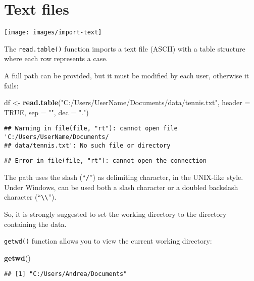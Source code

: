 \documentclass[]{book}
\newenvironment{Shaded}{\begin{snugshade}}{\end{snugshade}}
\newcommand{\KeywordTok}[1]{\textcolor[rgb]{0.13,0.29,0.53}{\textbf{{#1}}}}
\newcommand{\DataTypeTok}[1]{\textcolor[rgb]{0.13,0.29,0.53}{{#1}}}
\newcommand{\StringTok}[1]{\textcolor[rgb]{0.31,0.60,0.02}{{#1}}}
\newcommand{\OtherTok}[1]{\textcolor[rgb]{0.56,0.35,0.01}{{#1}}}
\newcommand{\NormalTok}[1]{{#1}}
\begin{document}
\section{Text files}\label{text-files}

\texttt{[image: images/import-text]}

The \texttt{read.table()} function imports a text file (ASCII) with a
table structure where each row represents a case.

A full path can be provided, but it must be modified by each user,
otherwise it fails:

\begin{Shaded}
\begin{Highlighting}[]
\NormalTok{df <-}\StringTok{ }\KeywordTok{read.table}\NormalTok{(}\StringTok{"C:/Users/UserName/Documents/data/tennis.txt"}\NormalTok{, }\DataTypeTok{header =} \OtherTok{TRUE}\NormalTok{, }\DataTypeTok{sep =} \StringTok{""}\NormalTok{, }\DataTypeTok{dec =} \StringTok{"."}\NormalTok{)}
\end{Highlighting}
\end{Shaded}

\begin{verbatim}
## Warning in file(file, "rt"): cannot open file 'C:/Users/UserName/Documents/
## data/tennis.txt': No such file or directory
\end{verbatim}

\begin{verbatim}
## Error in file(file, "rt"): cannot open the connection
\end{verbatim}

The path uses the slash (``\texttt{/}'') as delimiting character, in the
UNIX-like style. Under Windows, can be used both a slash character or a
doubled backslash character
(``\texttt{\textbackslash{}\textbackslash{}}'').

So, it is strongly suggested to set the working directory to the
directory containing the data.

\texttt{getwd()} function allows you to view the current working
directory:

\begin{Shaded}
\begin{Highlighting}[]
\KeywordTok{getwd}\NormalTok{() }
\end{Highlighting}
\end{Shaded}

\begin{verbatim}
## [1] "C:/Users/Andrea/Documents"
\end{verbatim}
\end{document}
